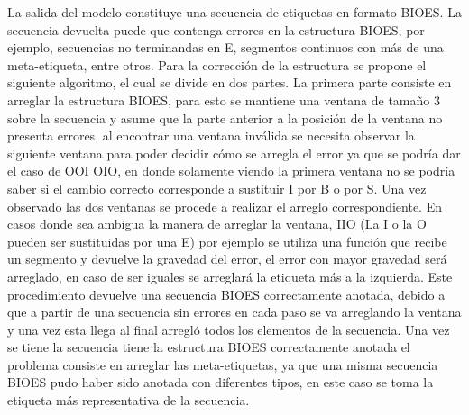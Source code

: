 La salida del modelo constituye una secuencia de etiquetas en formato BIOES. La secuencia devuelta puede que contenga
errores en la estructura BIOES, por ejemplo, secuencias no terminandas en E, segmentos continuos con más de una meta-etiqueta,
entre otros.
Para la corrección de la estructura se propone el siguiente algoritmo, el cual se divide en dos partes. La primera
parte consiste en arreglar la estructura BIOES, para esto se mantiene una ventana de tamaño
3 sobre la secuencia y asume que la parte anterior a la posición de la ventana no presenta errores, al encontrar una
ventana inválida se necesita observar la siguiente ventana para poder decidir cómo se arregla el error ya que se
podría dar el caso de OOI OIO, en donde solamente viendo la primera ventana no se podría saber si el cambio 
correcto corresponde a sustituir I por B o por S. Una vez observado las dos ventanas se procede a realizar el 
arreglo correspondiente. En casos donde sea ambigua la manera de arreglar la ventana, IIO (La I o la O pueden ser 
sustituidas por una E) por ejemplo se utiliza una función que recibe un segmento y devuelve la gravedad del error,
el error con mayor gravedad será arreglado, en caso de ser iguales se arreglará la etiqueta más a la izquierda.
Este procedimiento devuelve una secuencia BIOES correctamente anotada, debido a que a partir de una secuencia sin 
errores en cada paso se va arreglando la ventana y una vez esta llega al final arregló todos los elementos de la secuencia.
Una vez se tiene la secuencia tiene la estructura BIOES correctamente anotada el problema
consiste en arreglar las meta-etiquetas, ya que una misma secuencia BIOES pudo haber sido anotada con diferentes
tipos, en este caso se toma la etiqueta más representativa de la secuencia.

